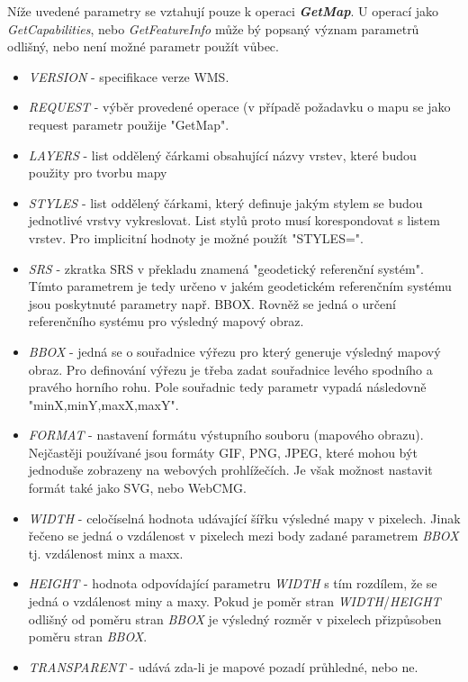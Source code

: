Níže uvedené parametry se vztahují pouze k operaci
\textbf{\textit{GetMap}}. U operací jako \textit{GetCapabilities},
nebo \textit{GetFeatureInfo} může bý popsaný význam parametrů odlišný,
nebo není možné parametr použít vůbec.

\begin{itemize}
\item\textit{VERSION} - specifikace verze WMS.
	
\item\textit{REQUEST} - výběr provedené operace (v případě požadavku o
  mapu se jako request parametr použije "GetMap".
	
\item\textit{LAYERS} - list oddělený čárkami obsahující názvy vrstev,
  které budou použity pro tvorbu mapy
	
\item\textit{STYLES} - list oddělený čárkami, který definuje jakým
  stylem se budou jednotlivé vrstvy vykreslovat. List stylů proto musí
  korespondovat s listem vrstev. Pro implicitní hodnoty je možné
  použít "STYLES=".
	
\item\textit{SRS} - zkratka SRS v překladu znamená "geodetický
  referenční systém". Tímto parametrem je tedy určeno v jakém
  geodetickém referenčním systému jsou poskytnuté parametry
  např. BBOX. Rovněž se jedná o určení referenčního systému pro
  výsledný mapový obraz.
	
\item\textit{BBOX} - jedná se o souřadnice výřezu pro který generuje
  výsledný mapový obraz. Pro definování výřezu je třeba zadat
  souřadnice levého spodního a pravého horního rohu. Pole souřadnic
  tedy parametr vypadá následovně "minX,minY,maxX,maxY".
	
\item\textit{FORMAT} - nastavení formátu výstupního souboru (mapového
  obrazu). Nejčastěji používané jsou formáty GIF, PNG, JPEG, které
  mohou být jednoduše zobrazeny na webových prohlížečích. Je však
  možnost nastavit formát také jako SVG, nebo WebCMG.
	
\item\textit{WIDTH} - celočíselná hodnota udávající šířku výsledné
  mapy v pixelech. Jinak řečeno se jedná o vzdálenost v pixelech mezi
  body zadané parametrem \textit{BBOX} tj. vzdálenost minx a maxx.
	
\item\textit{HEIGHT} - hodnota odpovídající parametru \textit{WIDTH} s
  tím rozdílem, že se jedná o vzdálenost miny a maxy. Pokud je poměr
  stran \textit{WIDTH}/\textit{HEIGHT} odlišný od poměru stran
  \textit{BBOX} je výsledný rozměr v pixelech přizpůsoben poměru stran
  \textit{BBOX}.
	
\item\textit{TRANSPARENT} - udává zda-li je mapové pozadí průhledné,
  nebo ne.
\end{itemize}

